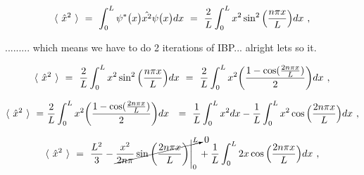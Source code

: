 \documentclass{article}
\begin{document}
\begin{equation} \label{eb-eq-254-1}
\langle \hspace{0.125cm} \hat{x}^{2} \hspace{0.125cm} \rangle \hspace{0.125cm} = \hspace{0.125cm} \int_{0}^{L} \psi^{\ast}\big(x\big) \hat{x^{2}} \psi\big(x\big) dx \hspace{0.125cm} = \hspace{0.125cm} \frac{2}{L} \int_{0}^{L} x^2 \sin^{2}\Big(\frac{n\pi x}{L}\Big) dx \hspace{0.125cm} , 
\end{equation}

......... which means we have to do 2 iterations of IBP... alright lets so it. 

\begin{equation} \label{eb-eq-255-1}
\langle \hspace{0.125cm} \hat{x}^{2} \hspace{0.125cm} \rangle \hspace{0.125cm} = \hspace{0.125cm} \frac{2}{L} \int_{0}^{L} x^2 \sin^{2}\Big(\frac{n\pi x}{L}\Big) dx \hspace{0.125cm} = \hspace{0.125cm} \frac{2}{L} \int_{0}^{L} x^2 \bigg( \frac{1 - \cos(\frac{2 n \pi x}{L})}{2} \bigg) dx \hspace{0.125cm} ,
\end{equation}

\begin{equation} \label{eb-eq-255-2}
\langle \hspace{0.125cm} \hat{x}^{2} \hspace{0.125cm} \rangle \hspace{0.125cm} = \hspace{0.0125cm} \frac{2}{L} \int_{0}^{L} x^2 \bigg( \frac{1 - \cos(\frac{2 n \pi x}{L})}{2} \bigg) dx \hspace{0.125cm} \hspace{0.125cm} = \hspace{0.125cm} \frac{1}{L} \int_{0}^{L} x^2 dx - \frac{1}{L} \int_{0}^{L} x^2 \cos\Big(\frac{2 n \pi x}{L}\Big) dx \hspace{0.125cm},
\end{equation}

\begin{equation} \label{eb-eq-255-3}
\langle \hspace{0.125cm} \hat{x}^{2} \hspace{0.125cm} \rangle \hspace{0.125cm} = \hspace{0.125cm} \frac{L^2}{3} - \cancelto{0}{\frac{x^2}{2 n \pi}\sin\bigg(\frac{2 n \pi x}{L}\bigg) \Bigg|_{0}^{L}} + \frac{1}{L} \int_{0}^{L} 2 x \cos\Big(\frac{2 n \pi x}{L}\Big) dx \hspace{0.125cm} ,
\end{equation}
\end{document}
